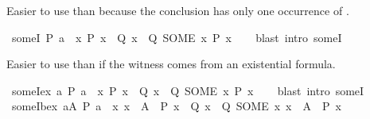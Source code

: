 \begin{isabellebody}
%
\begin{isamarkuptext}%
Easier to use than  because the conclusion has only one
  occurrence of .%
\end{isamarkuptext}\isamarkuptrue%
\isamarkupfalse%
\ someI{}{\isacharcolon}{\kern0pt}\ {\isachardoublequoteopen}P\ a\ {\isasymLongrightarrow}\ {\isacharparenleft}{\kern0pt}{\isasymAnd}x{\isachardot}{\kern0pt}\ P\ x\ {\isasymLongrightarrow}\ Q\ x{\isacharparenright}{\kern0pt}\ {\isasymLongrightarrow}\ Q\ {\isacharparenleft}{\kern0pt}SOME\ x{\isachardot}{\kern0pt}\ P\ x{\isacharparenright}{\kern0pt}{\isachardoublequoteclose}\isanewline
%
\isadelimproof
\ \ %
\endisadelimproof
%
\isatagproof
{}\isamarkupfalse%
\ {\isacharparenleft}{\kern0pt}blast\ intro{\isacharcolon}{\kern0pt}\ someI{\isacharparenright}{\kern0pt}%
\endisatagproof
{\isafoldproof}%
%
\isadelimproof
%
\endisadelimproof
%
\begin{isamarkuptext}%
Easier to use than  if the witness comes from an
  existential formula.%
\end{isamarkuptext}\isamarkuptrue%
\isamarkupfalse%
\ someI{}{\isacharunderscore}{\kern0pt}ex{\isacharcolon}{\kern0pt}\ {\isachardoublequoteopen}{\isasymexists}a{\isachardot}{\kern0pt}\ P\ a\ {\isasymLongrightarrow}\ {\isacharparenleft}{\kern0pt}{\isasymAnd}x{\isachardot}{\kern0pt}\ P\ x\ {\isasymLongrightarrow}\ Q\ x{\isacharparenright}{\kern0pt}\ {\isasymLongrightarrow}\ Q\ {\isacharparenleft}{\kern0pt}SOME\ x{\isachardot}{\kern0pt}\ P\ x{\isacharparenright}{\kern0pt}{\isachardoublequoteclose}\isanewline
%
\isadelimproof
\ \ %
\endisadelimproof
%
\isatagproof
{}\isamarkupfalse%
\ {\isacharparenleft}{\kern0pt}blast\ intro{\isacharcolon}{\kern0pt}\ someI{}{\isacharparenright}{\kern0pt}%
\endisatagproof
{\isafoldproof}%
%
\isadelimproof
\isanewline
%
\endisadelimproof
\isanewline
{}\isamarkupfalse%
\ someI{}{\isacharunderscore}{\kern0pt}bex{\isacharcolon}{\kern0pt}\ {\isachardoublequoteopen}{\isasymexists}a{\isasymin}A{\isachardot}{\kern0pt}\ P\ a\ {\isasymLongrightarrow}\ {\isacharparenleft}{\kern0pt}{\isasymAnd}x{\isachardot}{\kern0pt}\ x\ {\isasymin}\ A\ {\isasymand}\ P\ x\ {\isasymLongrightarrow}\ Q\ x{\isacharparenright}{\kern0pt}\ {\isasymLongrightarrow}\ Q\ {\isacharparenleft}{\kern0pt}SOME\ x{\isachardot}{\kern0pt}\ x\ {\isasymin}\ A\ {\isasymand}\ P\ x{\isacharparenright}{\kern0pt}{\isachardoublequoteclose}\isanewline
%
\isadelimproof
\ \ %
\endisadelimproof

\end{isabellebody}

